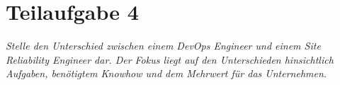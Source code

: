 \chapter{Teilaufgabe 4}

\textit{Stelle den Unterschied zwischen einem DevOps Engineer und einem Site Reliability Engineer dar. Der Fokus liegt auf den Unterschieden hinsichtlich Aufgaben, benötigtem Knowhow und dem Mehrwert für das Unternehmen.}